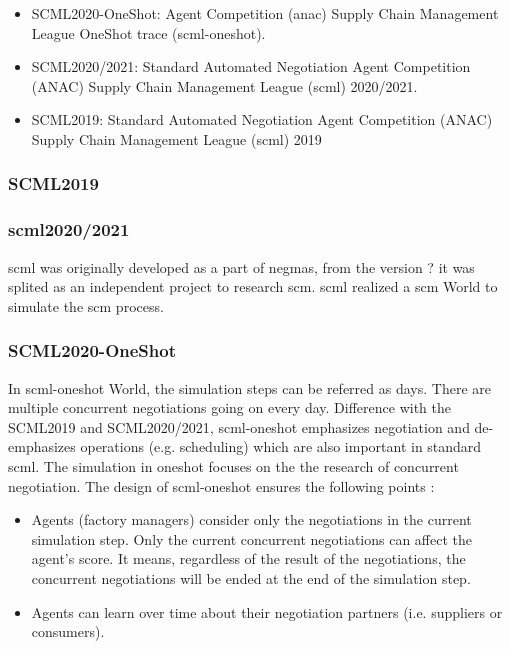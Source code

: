 \begin{itemize}
	\item SCML2020-OneShot: Agent Competition (\gls{anac}) Supply Chain Management League OneShot trace (\gls{scml-oneshot}).
	\item SCML2020/2021: Standard Automated Negotiation Agent Competition (ANAC) Supply Chain Management League (\gls{scml}) 2020/2021.
	\item SCML2019: Standard Automated Negotiation Agent Competition (ANAC) Supply Chain Management League (\gls{scml}) 2019
\end{itemize}

\subsubsection{SCML2019}

\subsubsection{\gls{scml}2020/2021}
\gls{scml} was originally developed as a part of \gls{negmas}, from the version ? it was splited as an independent project to research \gls{scm}. \gls{scml} realized a \gls{scm} World to simulate the \gls{scm} process.  

\subsubsection{SCML2020-OneShot} 
In \gls{scml-oneshot} World, the simulation steps can be referred as days. There are multiple concurrent negotiations going on every day. Difference with the SCML2019 and SCML2020/2021, \gls{scml-oneshot} emphasizes negotiation and de-emphasizes operations (e.g. scheduling) which are also important in standard scml. The simulation in oneshot focuses on the the research of concurrent negotiation. The design of \gls{scml-oneshot} ensures the following points \parencite{Mohammad2021}:

\begin{itemize}
	\item Agents (factory managers) consider only the negotiations in the current simulation step. Only the current concurrent negotiations can affect the agent's score. It means, regardless of the result of the negotiations, the concurrent negotiations will be ended at the end of the simulation step. 
	\item Agents can learn over time about their negotiation partners (i.e. suppliers or consumers).
\end{itemize} 

